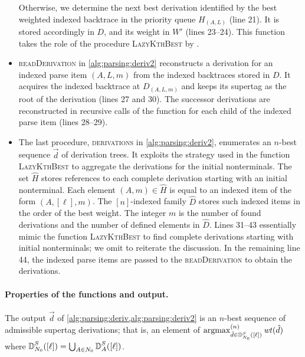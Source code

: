 \documentclass[../../document.tex]{subfiles}
\begin{document}
\begin{itemize}
            Otherwise, we determine the next best derivation identified by the best weighted indexed backtrace in the priority queue \(H_{(A, L)}\) (line 21).
            It is stored accordingly in \(D\), and its weight in \(W'\) (lines 23--24).
            This function takes the role of the procedure \textsc{LazyKthBest} by .
        \item \textsc{readDerivation} in \cref{alg:parsing:deriv2} reconstructs a derivation for an indexed parse item \((A, L, m)\) from the indexed backtraces stored in \(D\).
            It acquires the indexed backtrace at \(D_{(A, L, m)}\) and keeps its supertag as the root of the derivation (lines 27 and 30).
            The successor derivations are reconstructed in recursive calls of the function for each child of the indexed parse item (lines 28--29).
        \item The last procedure, \textsc{derivations} in \cref{alg:parsing:deriv2}, enumerates an \(n\)-best sequence \(\vec{d}\) of derivation trees.
            It exploits the strategy used in the function \textsc{LazyKthBest} to aggregate the derivations for the initial nonterminals.
            The set \(\hat{H}\) stores references to each complete derivation starting with an initial nonterminal.
            Each element \((A, m) \in \hat{H}\) is equal to an indexed item of the form \((A, [\ell], m)\).
            The \([n]\)-indexed family \(\hat{D}\) stores such indexed items in the order of the best weight.
            The integer \(m\) is the number of found derivations and the number of defined elements in \(\hat{D}\).
            Lines 31--43 essentially mimic the function \textsc{LazyKthBest} to find complete derivations starting with initial nonterminals; we omit to reiterate the discussion.
            In the remaining line 44, the indexed parse items are passed to the \textsc{readDerivation} to obtain the derivations.
    \end{itemize}

    \paragraph{Properties of the functions and output.}
    The output \(\vec{d}\) of \cref{alg:parsing:deriv,alg:parsing:deriv2} is an \(n\)-best sequence of admissible  supertag derivations; that is, an element of \(\operatorname{arg max}^{(n)}_{\hat{d} \in \operatorname{\mathbb{D}}^S_{N_0}([\ell])} \mathit{wt}(\hat{d})\) where \(\operatorname{\mathbb{D}}^S_{N_0}([\ell]) = \bigcup_{A \in N_0} \operatorname{\mathbb{D}}^S_{A}([\ell])\).
\end{document}
